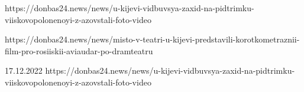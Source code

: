  
 
 
 
 

https://donbas24.news/news/u-kijevi-vidbuvsya-zaxid-na-pidtrimku-viiskovopolonenoyi-z-azovstali-foto-video

https://donbas24.news/news/misto-v-teatri-u-kijevi-predstavili-korotkometraznii-film-pro-rosiiskii-aviaudar-po-dramteatru

17.12.2022
https://donbas24.news/news/u-kijevi-vidbuvsya-zaxid-na-pidtrimku-viiskovopolonenoyi-z-azovstali-foto-video


